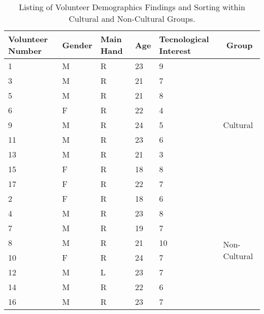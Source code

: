     \begin{table}[ht]
    \begin{tabular}{|l|l|l|l|l|l|}
    \hline
    Volunteer Number & Gender & Main Hand & Age & Tecnological Interest & \multicolumn{1}{c|}{Group}    \\ \hline
    1                & M      & R         & 23  & 9                     & \multirow{9}{*}{Cultural}     \\ \cline{1-5}
    3                & M      & R         & 21  & 7                     &                               \\ \cline{1-5}
    5                & M      & R         & 21  & 8                     &                               \\ \cline{1-5}
    6                & F      & R         & 22  & 4                     &                               \\ \cline{1-5}
    9                & M      & R         & 24  & 5                     &                               \\ \cline{1-5}
    11               & M      & R         & 23  & 6                     &                               \\ \cline{1-5}
    13               & M      & R         & 21  & 3                     &                               \\ \cline{1-5}
    15               & F      & R         & 18  & 8                     &                               \\ \cline{1-5}
    17               & F      & R         & 22  & 7                     &                               \\ \hline
    2                & F      & R         & 18  & 6                     & \multirow{8}{*}{Non-Cultural} \\ \cline{1-5}
    4                & M      & R         & 23  & 8                     &                               \\ \cline{1-5}
    7                & M      & R         & 19  & 7                     &                               \\ \cline{1-5}
    8                & M      & R         & 21  & 10                    &                               \\ \cline{1-5}
    10               & F      & R         & 24  & 7                     &                               \\ \cline{1-5}
    12               & M      & L         & 23  & 7                     &                               \\ \cline{1-5}
    14               & M      & R         & 22  & 6                     &                               \\ \cline{1-5}
    16               & M      & R         & 23  & 7                     &                               \\ \hline
    \end{tabular}
    \caption{\label{tab:Table_UserDemographics}Listing of Volunteer Demographics Findings and Sorting within Cultural and Non-Cultural Groups.}
    \end{table}